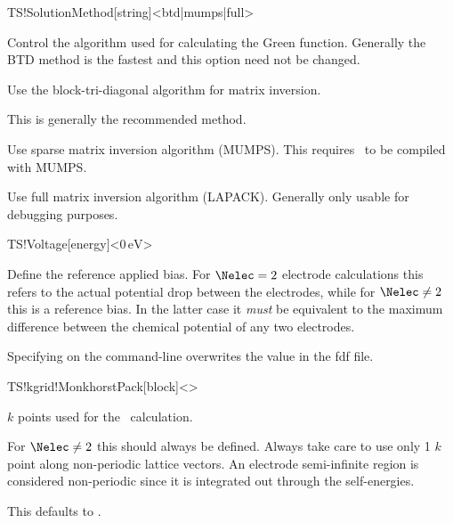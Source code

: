 \begin{fdfentry}{TS!SolutionMethod}[string]<btd|mumps|full>

  Control the algorithm used for calculating the Green
  function. Generally the BTD method is the fastest and this option
  need not be changed.

  \begin{fdfoptions}
    \option[BTD]%
    Use the block-tri-diagonal algorithm for matrix inversion.

    This is generally the recommended method.

    \option[MUMPS]%
    Use sparse matrix inversion algorithm (MUMPS). This requires
    \tsiesta\ to be compiled with MUMPS.

    \option[full]%
    Use full matrix inversion algorithm (LAPACK). Generally only
    usable for debugging purposes.
    
  \end{fdfoptions}
  
\end{fdfentry}

\begin{fdfentry}{TS!Voltage}[energy]<$0\,\mathrm{eV}$>

  Define the reference applied bias. For $\Nelec=2$ electrode calculations
  this refers to the actual potential drop between the electrodes,
  while for $\Nelec\neq2$ this is a reference bias. In the latter case it
  \emph{must} be equivalent to the maximum difference between the
  chemical potential of any two electrodes.

  \note Specifying  on the
  command-line overwrites the value in the fdf file.
  
\end{fdfentry}

\begin{fdfentry}{TS!kgrid!MonkhorstPack}[block]<>

  $k$ points used for the \tsiesta\ calculation.

  For $\Nelec\neq2$ this should always be defined. Always take care to
  use only 1 $k$ point along non-periodic lattice vectors. An
  electrode semi-infinite region is considered non-periodic since it
  is integrated out through the self-energies.

  This defaults to .
  
\end{fdfentry}

